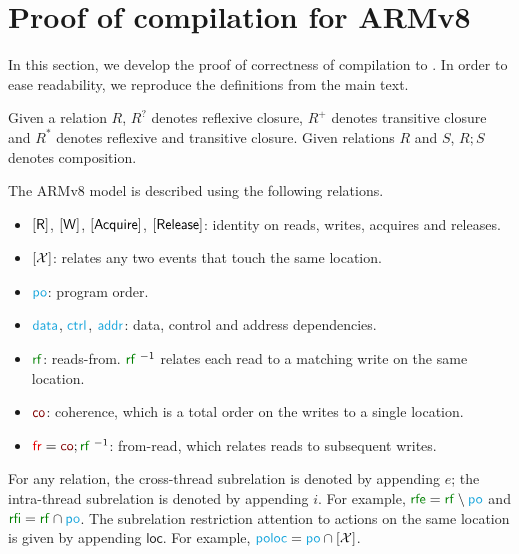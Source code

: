 \section{Proof of compilation for ARMv8}
\label{sec:arm:proof}

In this section, we develop the proof of correctness of compilation to \armeight.  In order to ease readability, we reproduce the definitions from the main text. 



Given a relation $R$, $R^?$ denotes reflexive closure, $R^+$ denotes
transitive closure and $R^*$ denotes reflexive and transitive closure.  Given relations $R$ and $S$, $R;S$ denotes composition.


The ARMv8 model is described using the following relations.
\begin{itemize}
\item $[\mathsf{R}]$, $[\mathsf{W}]$, $[\mathsf{Acquire}]$, $[\mathsf{Release}]$: identity on reads, writes, acquires
  and releases.
\item $[\mathcal{X}]$: relates any two events that touch the same location.
\item $\rpox$: program order.
\item $\rdata$, $\rctrl$, $\raddr$: data, control and address dependencies.
\item $\rrfx$: reads-from. $\rrfx^{-1}$ relates each read to a matching write
  on the same location.
\item $\rco$: coherence, which is a total order on the writes to a single
  location.
\item ${\rfr}\eqdef{\rco};\rrfx^{-1}$: from-read, which relates reads to
  subsequent writes.
\end{itemize}
For any relation, the cross-thread subrelation is denoted by appending $e$;
the intra-thread subrelation is denoted by appending $i$.  For example,
${\rrfe}\eqdef{\rrfx}\setminus{\rpox}$ and ${\rrfi}\eqdef{\rrfx}\cap{\rpox}$.
The subrelation restriction attention to actions on the same location is
given by appending $\mathsf{loc}$.  For example, ${\rpoloc}\eqdef{\rpox}\cap{\IDLoc}$.

